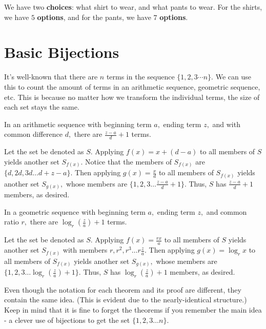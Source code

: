 \documentclass[blue,onecol]{shooting}
\begin{document}
\begin{sol}
We have two \textbf{choices}: what shirt to wear, and what pants to wear. For the shirts, we have $5$ \textbf{options}, and for the pants, we have $7$ \textbf{options}.
\end{sol}

\section{Basic Bijections}

It's well-known that there are $n$ terms in the sequence $\{1,2,3\cdots n\}.$ We can use this to count the amount of terms in an arithmetic sequence, geometric sequence, etc. This is because no matter how we transform the individual terms, the size of each set stays the same.

\begin{theo}
In an arithmetic sequence with beginning term $a,$ ending term $z,$ and with common difference $d,$ there are $\frac{z-a}{d}+1$ terms.
\end{theo}

\begin{pro}
Let the set be denoted as $S.$ Applying $f(x)=x+(d-a)$ to all members of $S$ yields another set $S_{f(x)}.$ Notice that the members of $S_{f(x)}$ are $\{d,2d,3d\dots d+z-a\}.$ Then applying $g(x)=\frac{x}{d}$ to all members of $S_{f(x)}$ yields another set $S_{g(x)},$ whose members are $\{1,2,3\dots \frac{z-a}{d}+1\}.$ Thus, $S$ has $\frac{z-a}{d}+1$ members, as desired.
\end{pro}

\begin{theo}
In a geometric sequence with beginning term $a,$ ending term $z,$ and common ratio $r,$ there are $\log_r(\frac{z}{a})+1$ terms.
\end{theo}

\begin{pro}
Let the set be denoted as $S.$ Applying $f(x)=\frac{rx}{a}$ to all members of $S$ yields another set $S_{f(x)}$ with members $r,r^2,r^3\dots r\frac{z}{a}.$ Then applying $g(x)=\log_r{x}$ to all members of $S_{f(x)}$ yields another set $S_{g(x)},$ whose members are $\{1,2,3\dots\log_r(\frac{z}{a})+1\}.$ Thus, $S$ has $\log_r(\frac{z}{a})+1$ members, as desired.
\end{pro}

Even though the notation for each theorem and its proof are different, they contain the same idea. (This is evident due to the nearly-identical structure.) Keep in mind that it is fine to forget the theorems if you remember the main idea - a clever use of bijections to get the set $\{1,2,3\dots n\}.$
\end{document}

